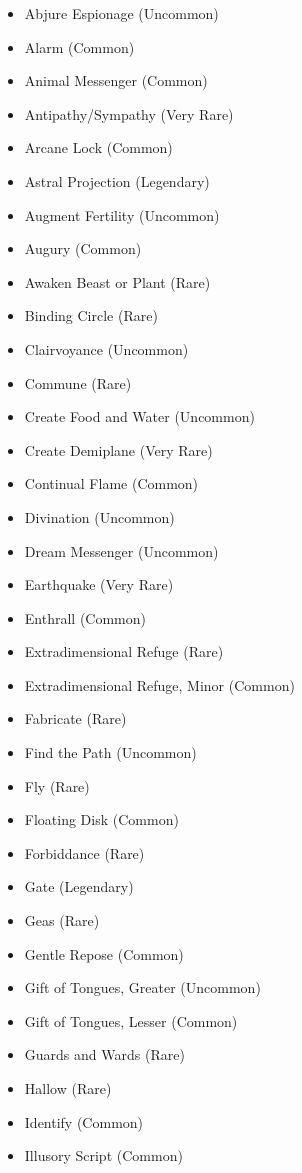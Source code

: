 \begin{itemize}
    \item Abjure Espionage (Uncommon)
    \item Alarm (Common)
    \item Animal Messenger (Common)
    \item Antipathy/Sympathy (Very Rare)
    \item Arcane Lock (Common)
    \item Astral Projection (Legendary)
    \item Augment Fertility (Uncommon)
    \item Augury (Common)
    \item Awaken Beast or Plant (Rare)
    \item Binding Circle (Rare)
    \item Clairvoyance (Uncommon)
    \item Commune (Rare)
    \item Create Food and Water (Uncommon)
		\item Create Demiplane (Very Rare)
    \item Continual Flame (Common)
    \item Divination (Uncommon)
    \item Dream Messenger (Uncommon)
    \item Earthquake (Very Rare)
    \item Enthrall (Common)
    \item Extradimensional Refuge (Rare)
    \item Extradimensional Refuge, Minor (Common)
    \item Fabricate (Rare)
    \item Find the Path (Uncommon)
    \item Fly (Rare)
    \item Floating Disk (Common)
    \item Forbiddance (Rare)
    \item Gate (Legendary)
    \item Geas (Rare)
    \item Gentle Repose (Common)    
    \item Gift of Tongues, Greater (Uncommon)
    \item Gift of Tongues, Lesser (Common)
    \item Guards and Wards (Rare)
    \item Hallow (Rare)
    \item Identify (Common)
    \item Illusory Script (Common)

\end{itemize}
